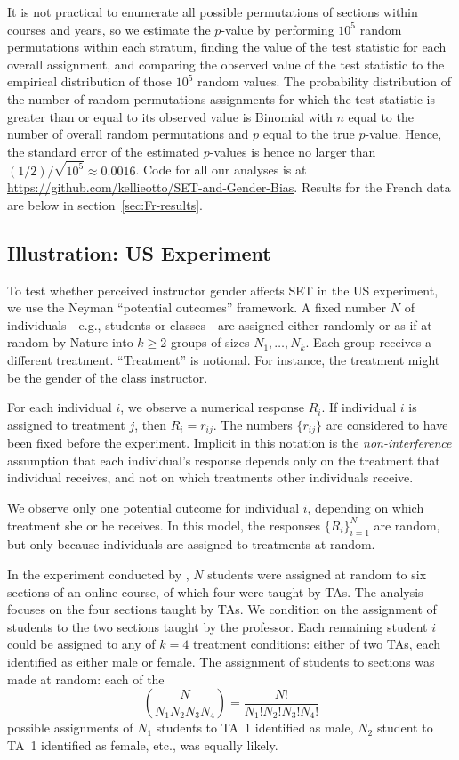 \documentclass[12pt]{article}
\newcommand{\beq}{\begin{equation}}
\newcommand{\eeq}{\end{equation}}
\begin{document}
It is not practical to enumerate all possible permutations of sections within courses
and years, so we estimate the $p$-value by performing $10^5$ 
random permutations within each stratum, finding the value of the test statistic for each
overall assignment, and comparing the observed value of the test statistic to the 
empirical distribution of those $10^5$ random values.
The probability distribution of the number of random permutations assignments for 
which the test statistic is greater than or equal to its observed value is Binomial with 
$n$ equal to the number of overall
random permutations and $p$ equal to the true $p$-value.
Hence, the standard error of the estimated $p$-values is hence no larger than 
$(1/2)/ \sqrt{10^5}
\approx 0.0016$.
Code for all our analyses is at 
\url{https://github.com/kellieotto/SET-and-Gender-Bias}.
Results for the French data are below in section~\ref{sec:Fr-results}.

\subsection{Illustration: US Experiment}
To test whether perceived instructor gender affects SET in the US experiment,
we use the Neyman ``potential outcomes'' framework.
A fixed number $N$ of individuals---e.g., students or classes---are assigned either
randomly or as if at random by Nature into 
$k \ge 2$ groups of sizes $N_1, \ldots, N_k$.
Each group receives a different treatment.
``Treatment'' is notional. 
For instance, the treatment might be the gender of the
class instructor.

For each individual $i$, we observe a numerical response $R_i$.
If individual $i$ is assigned to treatment $j$, then $R_i = r_{ij}$.
The numbers $\{r_{ij}\}$ are considered to have been fixed before the experiment.
Implicit in this notation is the \emph{non-interference} assumption that
each individual's response depends only on the treatment that individual receives, 
and not on which treatments other individuals receive.

We observe only one potential outcome for individual $i$, 
depending on which treatment she or he receives.
In this model, the responses $\{R_i\}_{i=1}^N$ are random, but only because 
individuals are assigned to treatments at random.

In the experiment conducted by \citet{MacNell2014},
$N$ students were assigned at random to six sections of an online course,
of which four were taught by TAs.
The analysis focuses on the four sections taught by TAs.
We condition on the assignment of students to the two sections taught by the professor.
Each remaining student $i$ could be assigned to any of $k=4$ treatment conditions:
either of two TAs, each identified as either male or female.
The assignment of students to sections was made at random: each of the
\beq
 {{N}\choose{N_1 N_2 N_3 N_4}} = \frac{N!}{N_1! N_2! N_3! N_4!}
\eeq
possible assignments of $N_1$ students to TA~1 identified as male,
$N_2$ student to TA~1 identified as female, etc., was equally likely.
\end{document}

